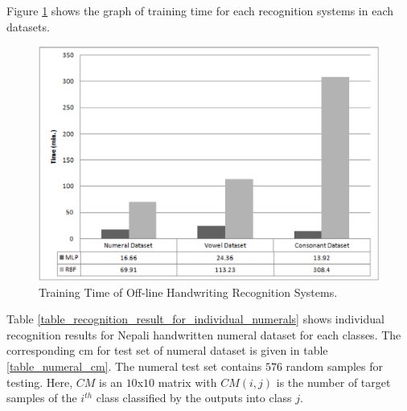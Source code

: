 Figure \ref{figure_training_time_graph} shows the graph of training time for each recognition systems in each datasets.
\begin{figure}[h]
\centering
\includegraphics[scale=0.80]{figures/experiments/training_time.eps}
\caption{Training Time of Off-line Handwriting Recognition Systems.}
\label{figure_training_time_graph}
\end{figure}

\pagebreak
Table \ref{table_recognition_result_for_individual_numerals} shows individual recognition results for Nepali handwritten numeral dataset for each classes. The corresponding \ac{cm}  for test set of numeral dataset is given in table \ref{table_numeral_cm}. The numeral test set contains $576$ random samples for testing. Here, $CM$ is an $10$x$10$ matrix with $CM(i,j)$ is the number of target samples of the $i^{th}$ class classified by the outputs into class $j$.


